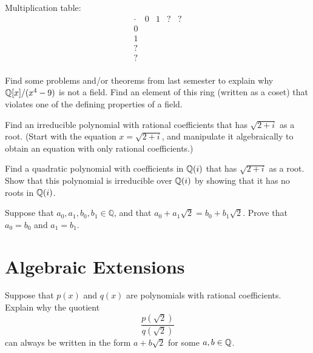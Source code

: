 Multiplication table:
\[
\begin{array}{c|cccc}
\cdot & 0   & 1  & ? & ? \\ \hline
0     &     &    &   &   \\
1     &     &    &   &   \\
?     &     &    &   &   \\
?     &     &    &   &   \\
\end{array}
\]

\begin{problem}
    Find some problems and/or theorems from last semester to explain why $\mathbb{Q}[x]/(x^4-9)$ is not a field. Find an element of this ring (written as a coset) that violates one of the defining properties of a field.
\end{problem}



\begin{problem}
    Find an irreducible polynomial with rational coefficients that has $\sqrt{2+i}$ as a root. (Start with the equation $x=\sqrt{2+i}$, and manipulate it algebraically to obtain an equation with only rational coefficients.)
\end{problem}



\begin{problem}
    Find a quadratic polynomial with coefficients in $\mathbb{Q}(i)$ that has $\sqrt{2+i}$ as a root. Show that this polynomial is irreducible over $\mathbb{Q}(i)$ by showing that it has no roots in $\mathbb{Q}(i)$.
\end{problem}




\begin{problem}\label{prob:root2a}
Suppose that $a_0, a_1, b_0, b_1 \in \mathbb{Q}$, and that $a_0 + a_1\sqrt{2} = b_0+b_1\sqrt{2}$.  Prove that $a_0 = b_0$ and $a_1 = b_1$.
\end{problem}

\section{Algebraic Extensions}

\begin{problem}\label{prob:root2b}
Suppose that $p(x)$ and $q(x)$ are polynomials with rational coefficients. Explain why the quotient
$$\frac{p\left(\sqrt{2}\right)}{q\left(\sqrt{2}\right)}$$ can always be written in the form $a + b\sqrt{2}$ for some $a,b \in \mathbb{Q}$.
\end{problem}

